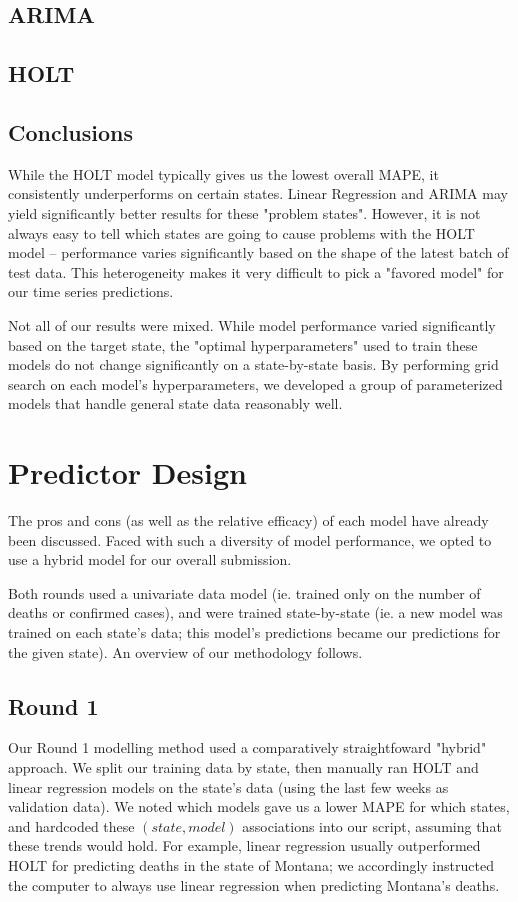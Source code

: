 \documentclass[sigconf,nonacm]{acmart}
\begin{document}
\subsection{ARIMA}
\subsection{HOLT}
\subsection{Conclusions}

While the HOLT model typically gives us the lowest overall MAPE, it
consistently underperforms on certain states. Linear Regression and ARIMA may
yield significantly better results for these "problem states". However, it is
not always easy to tell which states are going to cause problems with the HOLT
model -- performance varies significantly based on the shape of the latest
batch of test data. This heterogeneity makes it very difficult to pick a
"favored model" for our time series predictions. 

Not all of our results were mixed. While model performance varied significantly
based on the target state, the "optimal hyperparameters" used to train these
models do not change significantly on a state-by-state basis. By performing
grid search on each model's hyperparameters, we developed a group of
parameterized models that handle general state data reasonably well. 


\section{Predictor Design}

The pros and cons (as well as the relative efficacy) of each model have already
been discussed. Faced with such a diversity of model performance, we opted to
use a hybrid model for our overall submission. 

Both rounds used a univariate data model (ie. trained only on the number of
deaths or confirmed cases), and were trained state-by-state (ie. a new model
was trained on each state's data; this model's predictions became our
predictions for the given state). An overview of our methodology follows. 

\subsection{Round 1}

Our Round 1 modelling method used a comparatively straightfoward "hybrid"
approach. We split our training data by state, then manually ran HOLT and
linear regression models on the state's data (using the last few weeks as
validation data). We noted which models gave us a lower MAPE for which states,
and hardcoded these $(state, model)$ associations into our script, assuming
that these trends would hold. For example, linear regression usually
outperformed HOLT for predicting deaths in the state of Montana; we accordingly
instructed the computer to always use linear regression when predicting
Montana's deaths. 
\end{document}
